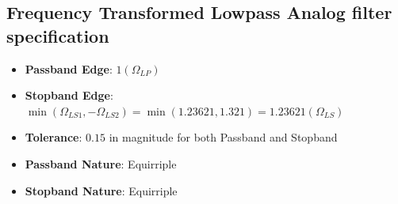 \documentclass[12pt, letterpaper,]{article}
\begin{document}
\subsection{Frequency Transformed Lowpass Analog filter specification}

\begin{itemize}
    \item \textbf{Passband Edge}: $1 (\Omega_{LP})$
    \item \textbf{Stopband Edge}: $\min(\Omega_{LS1},-\Omega_{LS2}) = \min(1.23621, 1.321) = 1.23621 (\Omega_{LS})$
    \item \textbf{Tolerance}: $0.15$ in magnitude for both Passband and Stopband
    \item \textbf{Passband Nature}: Equirriple
    \item \textbf{Stopband Nature}: Equirriple
\end{itemize}
\end{document}
